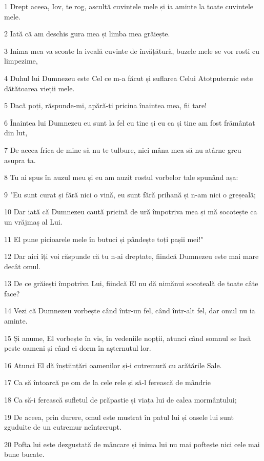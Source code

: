 \par 1 Drept aceea, Iov, te rog, ascultă cuvintele mele și ia aminte la toate cuvintele mele.
\par 2 Iată că am deschis gura mea și limba mea grăiește.
\par 3 Inima mea va scoate la iveală cuvinte de învățătură, buzele mele se vor rosti cu limpezime,
\par 4 Duhul lui Dumnezeu este Cel ce m-a făcut și suflarea Celui Atotputernic este dătătoarea vieții mele.
\par 5 Dacă poți, răspunde-mi, apără-ți pricina înaintea mea, fii tare!
\par 6 Înaintea lui Dumnezeu eu sunt la fel cu tine și eu ca și tine am fost frământat din lut,
\par 7 De aceea frica de mine să nu te tulbure, nici mâna mea să nu atârne greu asupra ta.
\par 8 Tu ai spus în auzul meu și eu am auzit rostul vorbelor tale spunând așa:
\par 9 "Eu sunt curat și fără nici o vină, eu sunt fără prihană și n-am nici o greșeală;
\par 10 Dar iată că Dumnezeu caută pricină de ură împotriva mea și mă socotește ca un vrăjmaș al Lui.
\par 11 El pune picioarele mele în butuci și pândește toți pașii mei!"
\par 12 Dar aici îți voi răspunde că tu n-ai dreptate, fiindcă Dumnezeu este mai mare decât omul.
\par 13 De ce grăiești împotriva Lui, fiindcă El nu dă nimănui socoteală de toate câte face?
\par 14 Vezi că Dumnezeu vorbește când într-un fel, când într-alt fel, dar omul nu ia aminte.
\par 15 Și anume, El vorbește în vis, în vedeniile nopții, atunci când somnul se lasă peste oameni și când ei dorm în așternutul lor.
\par 16 Atunci El dă înștiințări oamenilor și-i cutremură cu arătările Sale.
\par 17 Ca să întoarcă pe om de la cele rele și să-l ferească de mândrie
\par 18 Ca să-i ferească sufletul de prăpastie și viața lui de calea mormântului;
\par 19 De aceea, prin durere, omul este mustrat în patul lui și oasele lui sunt zguduite de un cutremur neîntrerupt.
\par 20 Pofta lui este dezgustată de mâncare și inima lui nu mai poftește nici cele mai bune bucate.
